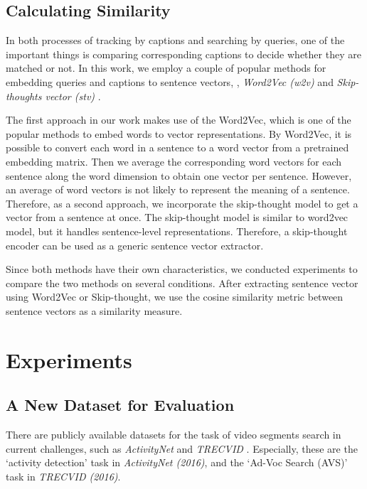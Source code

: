 \subsection{Calculating Similarity}
\label{Similarity}

In both processes of tracking by captions and searching by queries, one of the important things is comparing corresponding captions to decide whether they are matched or not. In this work, we employ a couple of popular methods for embedding queries and captions to sentence vectors, \ie, {\itshape Word2Vec (w2v)} \cite{mikolov2013distributed} and {\itshape Skip-thoughts vector (stv)} \cite{kiros2015skip}. 
%

The first approach in our work makes use of the Word2Vec, which is one of the popular methods to embed words to vector representations. By Word2Vec, it is possible to convert each word in a sentence to a word vector from a pretrained embedding matrix. 
Then we average the corresponding word vectors for each sentence along the word dimension to obtain one vector per sentence. 
However, an average of word vectors is not likely to represent the meaning of a sentence. 
Therefore, as a second approach, we incorporate the skip-thought model to get a vector from a sentence at once. 
The skip-thought model is similar to word2vec model, but it handles sentence-level representations. Therefore, a skip-thought encoder can be used as a generic sentence vector extractor. 

Since both methods have their own characteristics, we conducted experiments to compare the two methods on several conditions.
After extracting sentence vector using Word2Vec or Skip-thought, we use the cosine similarity metric between sentence vectors as a similarity measure. 

\section{Experiments}

\subsection{A New Dataset for Evaluation}
\label{sec:dataset}

There are publicly available datasets for the task of video segments search in current challenges, such as {\itshape ActivityNet} \cite{caba2015activitynet} and {\itshape TRECVID} \cite{2016trecvidawad}.
Especially, these are the `activity detection' task in {\itshape ActivityNet (2016)}, and the `Ad-Voc Search (AVS)' task in {\itshape TRECVID (2016)}.

